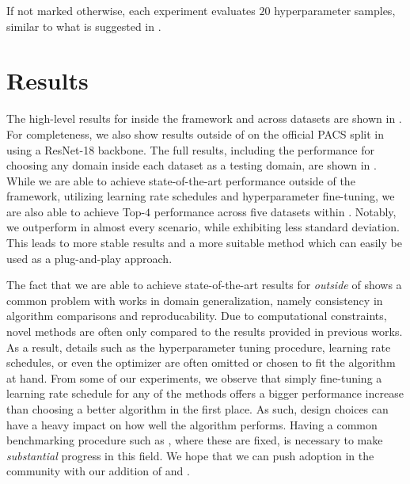 If not marked otherwise, each experiment evaluates $20$ hyperparameter samples, similar to what is suggested in \domainbed.

\section{Results}

The high-level results for \divcams inside the \domainbed framework and across datasets are shown in . For completeness, we also show results outside of \domainbed on the official PACS split in  using a ResNet-18 backbone. The full results, including the performance for choosing any domain inside each dataset as a testing domain, are shown in . While we are able to achieve state-of-the-art performance outside of the \domainbed framework, utilizing learning rate schedules and hyperparameter fine-tuning, we are also able to achieve Top-$4$ performance across five datasets within \domainbed. Notably, we outperform \rsc in almost every scenario, while exhibiting less standard deviation. This leads to more stable results and a more suitable method which can easily be used as a plug-and-play approach. 

The fact that we are able to achieve state-of-the-art results for \divcams \emph{outside} of \domainbed shows a common problem with works in domain generalization, namely consistency in algorithm comparisons and reproducability. Due to computational constraints, novel methods are often only compared to the results provided in previous works. As a result, details such as the hyperparameter tuning procedure, learning rate schedules, or even the optimizer are often omitted or chosen to fit the algorithm at hand. From some of our experiments, we observe that simply fine-tuning a learning rate schedule for any of the methods offers a bigger performance increase than choosing a better algorithm in the first place. As such, design choices can have a heavy impact on how well the algorithm performs. Having a common benchmarking procedure such as \domainbed, where these are fixed, is necessary to make \emph{substantial} progress in this field. We hope that we can push adoption in the community with our addition of \rsc and \divcam. 

